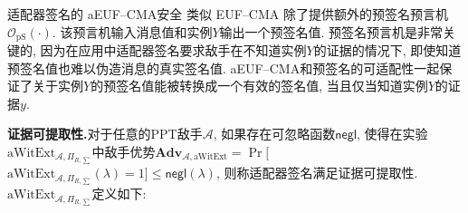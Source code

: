 \documentclass[review]{jcr}
\begin{document}
\begin{center}
\end{center}

适配器签名的 aEUF–CMA安全 类似 EUF–CMA 除了提供额外的预签名预言机$\mathcal{O}_{\text{pS}}(\cdot)$. 该预言机输入消息值和实例$Y$输出一个预签名值. 预签名预言机是非常关键的, 因为在应用中适配器签名要求敌手在不知道实例$Y$的证据的情况下, 即使知道预签名值也难以伪造消息的真实签名值. aEUF–CMA和预签名的可适配性一起保证了关于实例$Y$的预签名值能被转换成一个有效的签名值, 当且仅当知道实例$Y$的证据$y$. 

\begin{trivlist}
\item \textbf{证据可提取性.}对于任意的PPT敌手$\mathcal{A}$, 如果存在可忽略函数$\mathsf{negl}$, 使得在实验$\text{aWitExt}_{\mathcal{A},\Pi_{R,\sum}}$中敌手优势$\textbf{Adv}_{\mathcal{A},\text{aWitExt}}$$=$$\Pr[$$\text{aWitExt}_{\mathcal{A},\Pi_{R,\sum}}(\lambda) = 1] \leq \mathsf{negl}(\lambda)$, 则称适配器签名满足证据可提取性. $\text{aWitExt}_{\mathcal{A},\Pi_{R,\sum}}$定义如下: 
\end{trivlist}
\end{document}
